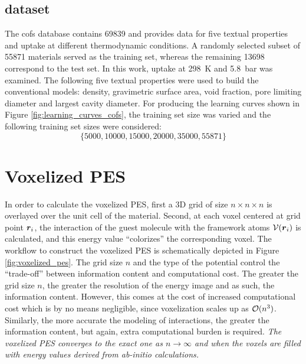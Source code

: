 \subsection{ dataset}

The \glspl{cof} database contains \num{69839} and provides data for five textual
properties and  uptake at different thermodynamic
conditions. A randomly selected subset of
\num{55871} materials served as the training set, whereas the remaining
\num{13698} correspond to the test set. In this work,  uptake at
\SI{298}{\kelvin} and \SI{5.8}{\bar} was examined. The following five textual properties
were used to build the conventional models: density, gravimetric surface area,
void fraction, pore limiting diameter and largest cavity diameter.
For producing the learning curves shown in Figure
\ref{fig:learning_curves_cofs}, the training set size was varied and the following
training set sizes were considered:
\begin{equation}
	\{
		\num{5000}, \num{10000}, \num{15000},
		\num{20000}, \num{35000}, \num{55871}
	\}
\end{equation}

\section{Voxelized PES}

In order to calculate the voxelized PES, first a 3D grid of size $n\times
n\times n$ is overlayed over the unit cell of the material. Second, at each
voxel centered at grid point $\boldsymbol{r}_i$, the interaction of the guest molecule
with the framework atoms $\mathcal{V}(\boldsymbol{r}_i)$ is calculated, and this energy
value ``colorizes'' the corresponding voxel. The workflow to construct the
voxelized PES is schematically depicted in Figure \ref{fig:voxelized_pes}. The
grid size $n$ and the type of the potential control the ``trade-off'' between
information content and computational
cost. The greater the grid size $n$, the greater the
resolution of the energy image and as such, the information content. However,
this comes at the cost of increased computational cost which is by no means
negligible, since voxelization scales up as $\mathcal{O}(n^3)$.
Similarly, the more accurate the modeling of interactions, the greater the
information content, but again, extra computational burden is required.
\emph{The voxelized PES converges to the exact one as $n \to \infty$ and when
the voxels are filled with energy values derived from ab-initio
calculations.}

